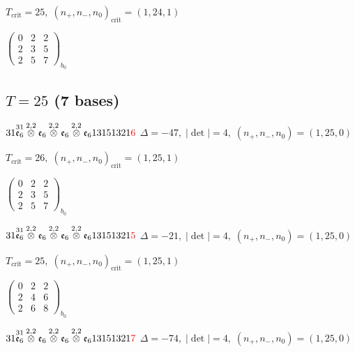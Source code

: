 \documentclass[10pt]{article}
\begin{document}
\hspace{1em}$T_{\text{crit}}=25,\; (n_+,n_-,n_0)_{\text{crit}}=(1,24,1)$

\hspace{2em}$\left(\begin{smallmatrix}0 & 2 & 2 \\ 2 & 3 & 5 \\ 2 & 5 & 7\end{smallmatrix}\right)_{\!b_0}$


\subsection*{$T = 25$ \quad (7 bases)}
\smallskip

$31\overset{31}{\mathfrak{e}_6}\overset{2,2}{\otimes}\mathfrak{e}_6\overset{2,2}{\otimes}\mathfrak{e}_6\overset{2,2}{\otimes}\mathfrak{e}_613151321\textcolor{red}{6}$ \quad $\Delta=-47,\; |\det|=4,\; (n_+,n_-,n_0)=(1,25,0)$

\hspace{1em}$T_{\text{crit}}=26,\; (n_+,n_-,n_0)_{\text{crit}}=(1,25,1)$

\hspace{2em}$\left(\begin{smallmatrix}0 & 2 & 2 \\ 2 & 3 & 5 \\ 2 & 5 & 7\end{smallmatrix}\right)_{\!b_0}$

$31\overset{31}{\mathfrak{e}_6}\overset{2,2}{\otimes}\mathfrak{e}_6\overset{2,2}{\otimes}\mathfrak{e}_6\overset{2,2}{\otimes}\mathfrak{e}_613151321\textcolor{red}{5}$ \quad $\Delta=-21,\; |\det|=4,\; (n_+,n_-,n_0)=(1,25,0)$

\hspace{1em}$T_{\text{crit}}=25,\; (n_+,n_-,n_0)_{\text{crit}}=(1,25,1)$

\hspace{2em}$\left(\begin{smallmatrix}0 & 2 & 2 \\ 2 & 4 & 6 \\ 2 & 6 & 8\end{smallmatrix}\right)_{\!b_0}$

$31\overset{31}{\mathfrak{e}_6}\overset{2,2}{\otimes}\mathfrak{e}_6\overset{2,2}{\otimes}\mathfrak{e}_6\overset{2,2}{\otimes}\mathfrak{e}_613151321\textcolor{red}{7}$ \quad $\Delta=-74,\; |\det|=4,\; (n_+,n_-,n_0)=(1,25,0)$
\end{document}
